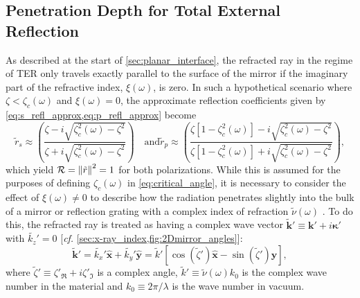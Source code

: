 \subsection{Penetration Depth for Total External Reflection}\label{sec:total_refl}
As described at the start of \cref{sec:planar_interface}, the refracted ray in the regime of TER only travels exactly parallel to the surface of the mirror if the imaginary part of the refractive index, $\xi (\omega)$, is zero.  
In such a hypothetical scenario where $\zeta < \zeta_c (\omega)$ and $\xi (\omega) = 0$, the approximate reflection coefficients given by \cref{eq:s_refl_approx,eq:p_refl_approx} become
\begin{subequations}
\begin{equation}\label{eq:s_refl_approx_TER}
 \tilde{r}_s \approx \left( \frac{\zeta - i \sqrt{\zeta^2_c (\omega) - \zeta^2}}{\zeta + i \sqrt{\zeta^2_c (\omega) - \zeta^2}} \right)\quad \text{and} 
 \end{equation}
\begin{equation}\label{eq:p_refl_approx_TER}
 \tilde{r}_p \approx \left( \frac{\zeta \left[ 1 - \zeta^2_c (\omega) \right] - i \sqrt{\zeta^2_c (\omega) - \zeta^2}}{\zeta \left[ 1 - \zeta^2_c (\omega) \right] + i \sqrt{\zeta^2_c (\omega) - \zeta^2}} \right) , 
 \end{equation}
\end{subequations}
which yield $\mathcal{R} = \norm{\tilde{r}}^2 =1$ for both polarizations. 
While this is assumed for the purposes of defining $\zeta_c (\omega)$ in \cref{eq:critical_angle}, it is necessary to consider the effect of $\xi (\omega) \neq 0$ to describe how the radiation penetrates slightly into the bulk of a mirror or reflection grating with a complex index of refraction $\tilde{\nu} (\omega)$ \cite{Attwood17,Vinogradov85}. 
To do this, the refracted ray is treated as having a complex wave vector $\mathbold{\tilde{k}}' \equiv \mathbold{k}' + i \mathbold{\kappa}'$ with $\tilde{k_z}'=0$ [\emph{cf.\@} \cref{sec:x-ray_index,fig:2Dmirror_angles}]:
\begin{equation}\label{eq:refacted_ray_TER}
 \mathbold{\tilde{k}}' = \tilde{k_x}' \mathbold{\hat{x}} + \tilde{k_y}' \mathbold{\hat{y}} = \tilde{k}' \left[ \cos \left( \tilde{\zeta}' \right) \mathbold{\hat{x}} - \sin \left( \tilde{\zeta}' \right) \mathbold{\hat{y}} \right] , 
 \end{equation}
where $\tilde{\zeta}' \equiv \zeta'_{\Re} + i \zeta'_{\Im}$ is a complex angle, $\tilde{k}' \equiv \tilde{\nu} (\omega) k_0$ is the complex wave number in the material and $k_0 \equiv 2 \pi / \lambda$ is the wave number in vacuum. 

